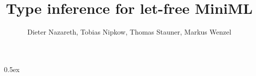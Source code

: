 \documentclass[11pt,a4paper]{article}
\begin{document}
\title{Type inference for let-free MiniML}
\author{Dieter Nazareth, Tobias Nipkow, Thomas Stauner, Markus Wenzel}
\maketitle

\tableofcontents

\parindent 0pt\parskip 0.5ex


%
%
\end{document}
